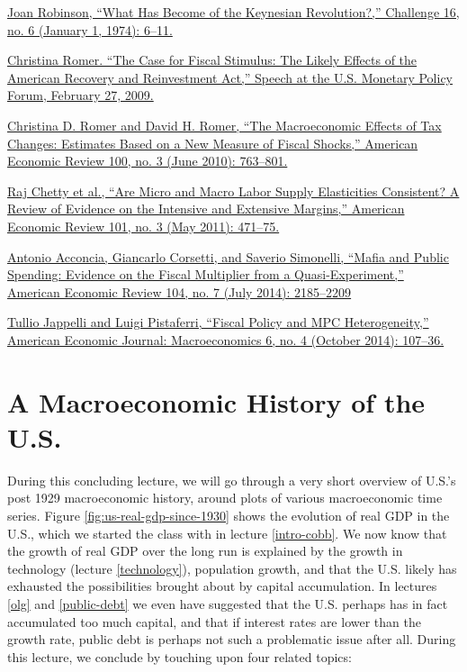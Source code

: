 \documentclass[]{book}
\begin{document}
\href{bib/Robinson1974.pdf}{Joan Robinson, ``What Has Become of the
Keynesian Revolution?,'' Challenge 16, no. 6 (January 1, 1974): 6--11.}

\href{https://obamawhitehouse.archives.gov/administration/eop/cea/speeches-testimony/02272009/}{Christina
Romer. ``The Case for Fiscal Stimulus: The Likely Effects of the
American Recovery and Reinvestment Act,'' Speech at the U.S. Monetary
Policy Forum, February 27, 2009.}

\href{https://doi.org/10.1257/aer.100.3.763}{Christina D. Romer and
David H. Romer, ``The Macroeconomic Effects of Tax Changes: Estimates
Based on a New Measure of Fiscal Shocks,'' American Economic Review 100,
no. 3 (June 2010): 763--801.}

\href{https://doi.org/10.1257/aer.101.3.471}{Raj Chetty et al., ``Are
Micro and Macro Labor Supply Elasticities Consistent? A Review of
Evidence on the Intensive and Extensive Margins,'' American Economic
Review 101, no. 3 (May 2011): 471--75.}

\href{https://doi.org/10.1257/aer.104.7.2185.}{Antonio Acconcia,
Giancarlo Corsetti, and Saverio Simonelli, ``Mafia and Public Spending:
Evidence on the Fiscal Multiplier from a Quasi-Experiment,'' American
Economic Review 104, no. 7 (July 2014): 2185--2209}

\href{https://doi.org/10.1257/mac.6.4.107}{Tullio Jappelli and Luigi
Pistaferri, ``Fiscal Policy and MPC Heterogeneity,'' American Economic
Journal: Macroeconomics 6, no. 4 (October 2014): 107--36.}

\chapter{A Macroeconomic History of the U.S.}\label{macro-history}

During this concluding lecture, we will go through a very short overview
of U.S.'s post 1929 macroeconomic history, around plots of various
macroeconomic time series. Figure \ref{fig:us-real-gdp-since-1930} shows
the evolution of real GDP in the U.S., which we started the class with
in lecture \ref{intro-cobb}. We now know that the growth of real GDP
over the long run is explained by the growth in technology (lecture
\ref{technology}), population growth, and that the U.S. likely has
exhausted the possibilities brought about by capital accumulation. In
lectures \ref{olg} and \ref{public-debt} we even have suggested that the
U.S. perhaps has in fact accumulated too much capital, and that if
interest rates are lower than the growth rate, public debt is perhaps
not such a problematic issue after all. During this lecture, we conclude
by touching upon four related topics:
\end{document}
